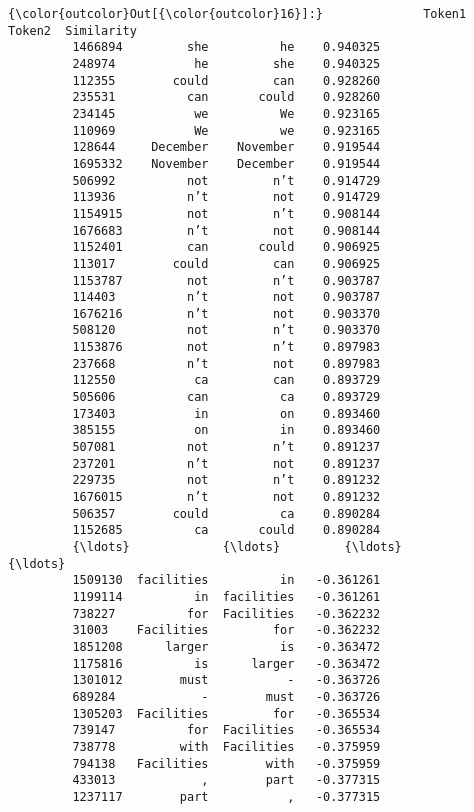 \documentclass[11pt]{article}
\begin{document}
\begin{Verbatim}[commandchars=\\\{\}]
{\color{outcolor}Out[{\color{outcolor}16}]:}              Token1      Token2  Similarity
         1466894         she          he    0.940325
         248974           he         she    0.940325
         112355        could         can    0.928260
         235531          can       could    0.928260
         234145           we          We    0.923165
         110969           We          we    0.923165
         128644     December    November    0.919544
         1695332    November    December    0.919544
         506992          not         n’t    0.914729
         113936          n’t         not    0.914729
         1154915         not         n’t    0.908144
         1676683         n’t         not    0.908144
         1152401         can       could    0.906925
         113017        could         can    0.906925
         1153787         not         n’t    0.903787
         114403          n’t         not    0.903787
         1676216         n’t         not    0.903370
         508120          not         n’t    0.903370
         1153876         not         n’t    0.897983
         237668          n’t         not    0.897983
         112550           ca         can    0.893729
         505606          can          ca    0.893729
         173403           in          on    0.893460
         385155           on          in    0.893460
         507081          not         n’t    0.891237
         237201          n’t         not    0.891237
         229735          not         n’t    0.891232
         1676015         n’t         not    0.891232
         506357        could          ca    0.890284
         1152685          ca       could    0.890284
         {\ldots}             {\ldots}         {\ldots}         {\ldots}
         1509130  facilities          in   -0.361261
         1199114          in  facilities   -0.361261
         738227          for  Facilities   -0.362232
         31003    Facilities         for   -0.362232
         1851208      larger          is   -0.363472
         1175816          is      larger   -0.363472
         1301012        must           -   -0.363726
         689284            -        must   -0.363726
         1305203  Facilities         for   -0.365534
         739147          for  Facilities   -0.365534
         738778         with  Facilities   -0.375959
         794138   Facilities        with   -0.375959
         433013            ,        part   -0.377315
         1237117        part           ,   -0.377315

\end{Verbatim}
\end{document}
